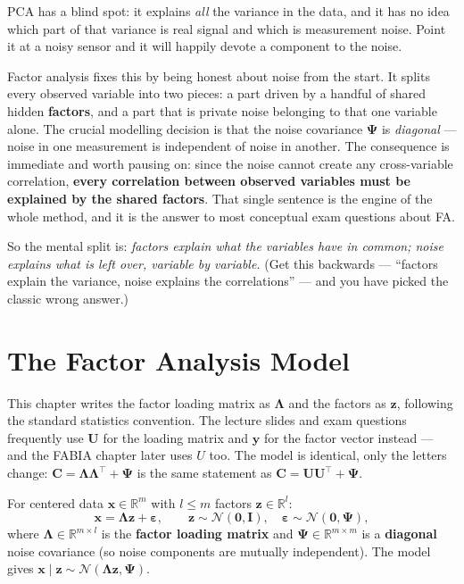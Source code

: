 \documentclass[11pt, oneside]{book}
\newcommand{\R}{\mathbb{R}}
\newcommand{\T}{^{\top}}
\begin{document}
PCA has a blind spot: it explains \emph{all} the variance in the data, and it has
no idea which part of that variance is real signal and which is measurement noise.
Point it at a noisy sensor and it will happily devote a component to the noise.

Factor analysis fixes this by being honest about noise from the start.
It splits every observed variable into two pieces: a part driven by a handful of
shared hidden \textbf{factors}, and a part that is private noise belonging to that
one variable alone.
The crucial modelling decision is that the noise covariance $\bm{\Psi}$ is
\emph{diagonal} --- noise in one measurement is independent of noise in another.
The consequence is immediate and worth pausing on: since the noise cannot create
any cross-variable correlation, \textbf{every correlation between observed
variables must be explained by the shared factors}.
That single sentence is the engine of the whole method, and it is the answer to
most conceptual exam questions about FA.

So the mental split is: \emph{factors explain what the variables have in common;
noise explains what is left over, variable by variable.}
(Get this backwards --- ``factors explain the variance, noise explains the
correlations'' --- and you have picked the classic wrong answer.)


\section{The Factor Analysis Model}

\begin{notebox}[title={Notation warning}]
This chapter writes the factor loading matrix as $\bm{\Lambda}$ and the factors as
$\bm{z}$, following the standard statistics convention.
The lecture slides and exam questions frequently use $\bm{U}$ for the loading
matrix and $\bm{y}$ for the factor vector instead --- and the FABIA chapter later
uses $U$ too.
The model is identical, only the letters change: $\bm{C}=\bm{\Lambda\Lambda}\T+\bm{\Psi}$
is the same statement as $\bm{C}=\bm{U}\bm{U}\T+\bm{\Psi}$.
\end{notebox}

\begin{defbox}[title={Factor Analysis Model}]
For centered data $\bm{x} \in \R^m$ with $l \leq m$ factors $\bm{z} \in \R^l$:
\[
  \bm{x} = \bm{\Lambda}\bm{z} + \bm{\varepsilon},
  \qquad
  \bm{z} \sim \mathcal{N}(\bm{0},\bm{I}),
  \quad
  \bm{\varepsilon} \sim \mathcal{N}(\bm{0},\bm{\Psi}),
\]
where $\bm{\Lambda} \in \R^{m \times l}$ is the \textbf{factor loading matrix} and
$\bm{\Psi} \in \R^{m \times m}$ is a \textbf{diagonal} noise covariance (so noise
components are mutually independent).
The model gives $\bm{x} \mid \bm{z} \sim \mathcal{N}(\bm{\Lambda}\bm{z},\bm{\Psi})$.
\end{defbox}
\end{document}
